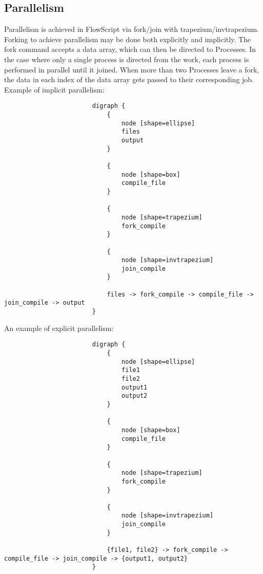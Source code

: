 \documentclass{article}
\begin{document}
			\subsection{Parallelism}
				Parallelism is achieved in FlowScript via fork/join with trapezium/invtrapezium. Forking to achieve parallelism may be done both explicitly and implicitly. The fork command accepts a data array, which can then be directed to Processes. In the case where only a single process is directed from the work, each process is performed in parallel until it joined. When more than two Processes leave a fork, the data in each index of the data array gets passed to their corresponding job. Example of implicit parallelism:
					\begin{verbatim}
						digraph {
						    {
						        node [shape=ellipse]
						        files
						        output
						    }

						    {
						        node [shape=box]
						        compile_file
						    }
    
						    {
						        node [shape=trapezium]
						        fork_compile
						    }

						    {
						        node [shape=invtrapezium]
						        join_compile
						    }

						    files -> fork_compile -> compile_file -> join_compile -> output
						}
					\end{verbatim}
				An example of explicit parallelism:
					\begin{verbatim}
						digraph {
						    {
						        node [shape=ellipse]
						        file1
						        file2
						        output1
						        output2
						    }

						    {
						        node [shape=box]
						        compile_file
						    }
    
						    {
						        node [shape=trapezium]
						        fork_compile
						    }

						    {
						        node [shape=invtrapezium]
						        join_compile
						    }

						    {file1, file2} -> fork_compile -> compile_file -> join_compile -> {output1, output2}
						}
					\end{verbatim}
\end{document}
